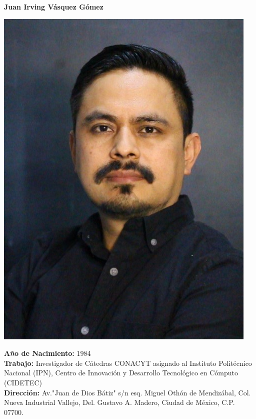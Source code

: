 \documentclass[10pt]{article}
\begin{document}
\begin{center}
{\bf {\LARGE Juan Irving Vásquez Gómez}}
\vspace{0.5cm}

\begin{minipage}[b]{0.30\linewidth}
	\centering
	\includegraphics[width=\textwidth]{jivg36}
\end{minipage}
\hspace{0.5cm}
\begin{minipage}[b]{0.6\linewidth}
\textbf{Año de Nacimiento:} 1984 \\
\textbf{Trabajo:} Investigador de Cátedras CONACYT asignado al Instituto Politécnico Nacional (IPN), Centro de Innovación y Desarrollo Tecnológico en Cómputo (CIDETEC) \href{https://www.cidetec.ipn.mx/}{\faExternalLink} \\ 
\textbf{Dirección:} Av."Juan de Dios Bátiz" s/n esq. Miguel Othón de Mendizábal, 
Col. Nueva Industrial Vallejo, Del. Gustavo A. Madero, Ciudad de México, C.P. 07700. \\

\end{minipage}
\end{center}
\end{document}
